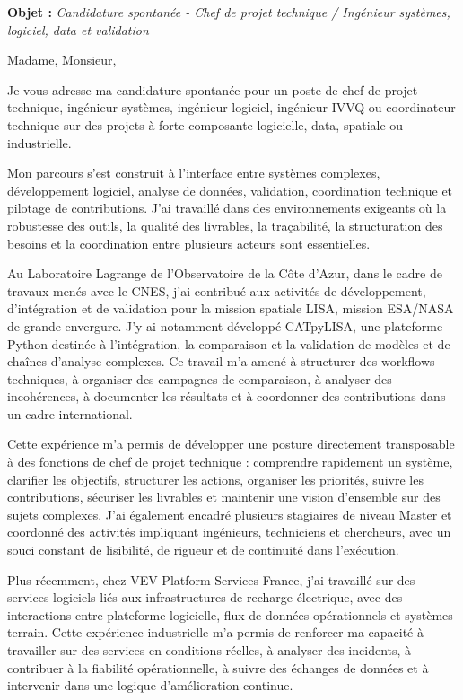 \documentclass[11pt,a4paper]{altacv}
\begin{document}
\makecvheader
\vspace{-0.6cm}

\vspace{-0.4cm}

{\color{accent}\textbf{Objet :}} \textit{Candidature spontanée - Chef de projet technique / Ingénieur systèmes, logiciel, data et validation}

{\color{body}

Madame, Monsieur,

Je vous adresse ma candidature spontanée pour un poste de chef de projet technique, ingénieur systèmes, ingénieur logiciel, ingénieur IVVQ ou coordinateur technique sur des projets à forte composante logicielle, data, spatiale ou industrielle.

Mon parcours s'est construit à l'interface entre systèmes complexes, développement logiciel, analyse de données, validation, coordination technique et pilotage de contributions. J'ai travaillé dans des environnements exigeants où la robustesse des outils, la qualité des livrables, la traçabilité, la structuration des besoins et la coordination entre plusieurs acteurs sont essentielles.

Au Laboratoire Lagrange de l'Observatoire de la Côte d'Azur, dans le cadre de travaux menés avec le CNES, j'ai contribué aux activités de développement, d'intégration et de validation pour la mission spatiale LISA, mission ESA/NASA de grande envergure. J'y ai notamment développé CATpyLISA, une plateforme Python destinée à l'intégration, la comparaison et la validation de modèles et de chaînes d'analyse complexes. Ce travail m'a amené à structurer des workflows techniques, à organiser des campagnes de comparaison, à analyser des incohérences, à documenter les résultats et à coordonner des contributions dans un cadre international.

Cette expérience m'a permis de développer une posture directement transposable à des fonctions de chef de projet technique : comprendre rapidement un système, clarifier les objectifs, structurer les actions, organiser les priorités, suivre les contributions, sécuriser les livrables et maintenir une vision d'ensemble sur des sujets complexes. J'ai également encadré plusieurs stagiaires de niveau Master et coordonné des activités impliquant ingénieurs, techniciens et chercheurs, avec un souci constant de lisibilité, de rigueur et de continuité dans l'exécution.

Plus récemment, chez VEV Platform Services France, j'ai travaillé sur des services logiciels liés aux infrastructures de recharge électrique, avec des interactions entre plateforme logicielle, flux de données opérationnels et systèmes terrain. Cette expérience industrielle m'a permis de renforcer ma capacité à travailler sur des services en conditions réelles, à analyser des incidents, à contribuer à la fiabilité opérationnelle, à suivre des échanges de données et à intervenir dans une logique d'amélioration continue.

}
\end{document}
